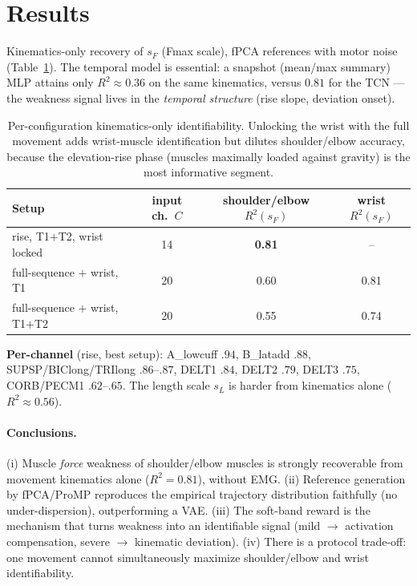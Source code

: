 \documentclass[11pt]{article}
\begin{document}
\section{Results}
Kinematics-only recovery of $s_F$ (Fmax scale), fPCA references with motor noise (Table~\ref{tab:res}). The temporal model is essential: a snapshot (mean/max summary) MLP attains only $R^2\!\approx\!0.36$ on the same kinematics, versus $0.81$ for the TCN --- the weakness signal lives in the \emph{temporal structure} (rise slope, deviation onset).

\begin{table}[h]\centering
\begin{tabular}{lccc}
\hline\hline
Setup & input ch.\ $C$ & shoulder/elbow $R^2(s_F)$ & wrist $R^2(s_F)$\\
\hline
rise, T1$+$T2, wrist locked & 14 & \textbf{0.81} & --\\
full-sequence $+$ wrist, T1 & 20 & 0.60 & 0.81\\
full-sequence $+$ wrist, T1$+$T2 & 20 & 0.55 & 0.74\\
\hline\hline
\end{tabular}
\caption{Per-configuration kinematics-only identifiability. Unlocking the wrist with the full movement adds wrist-muscle identification but dilutes shoulder/elbow accuracy, because the elevation-rise phase (muscles maximally loaded against gravity) is the most informative segment.}
\label{tab:res}
\end{table}

\noindent\textbf{Per-channel} (rise, best setup): A\_lowcuff $.94$, B\_latadd $.88$, SUPSP/BIClong/TRIlong $.86$--$.87$, DELT1 $.84$, DELT2 $.79$, DELT3 $.75$, CORB/PECM1 $.62$--$.65$. The length scale $s_L$ is harder from kinematics alone ($R^2\!\approx\!0.56$).

\paragraph{Conclusions.} (i) Muscle \emph{force} weakness of shoulder/elbow muscles is strongly recoverable from movement kinematics alone ($R^2{=}0.81$), without EMG. (ii) Reference generation by fPCA/ProMP reproduces the empirical trajectory distribution faithfully (no under-dispersion), outperforming a VAE. (iii) The soft-band reward is the mechanism that turns weakness into an identifiable signal (mild $\!\to\!$ activation compensation, severe $\!\to\!$ kinematic deviation). (iv) There is a protocol trade-off: one movement cannot simultaneously maximize shoulder/elbow and wrist identifiability.
\end{document}

